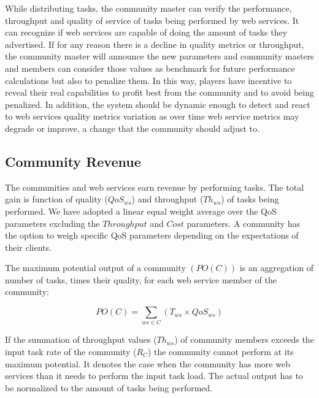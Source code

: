 While distributing tasks, the community master can verify the performance, throughput and quality of service of   tasks being performed by web services. It can recognize if web services are capable of doing the amount of tasks they advertised. If for any reason there is a decline in quality metrics or throughput, the  community master will announce the new parameters and community masters and members can consider those values as benchmark for future performance calculations but also to penalize them.
In this way, players have incentive to reveal their real capabilities to profit best from the community and to avoid being penalized. In addition, the system should be dynamic enough to detect and react to web services quality metrics variation as over time web service metrics may  degrade or improve, a change that the community should adjust to.

\subsection{Community Revenue}

The communities and web services earn revenue by performing tasks.
The total gain is function of quality ($QoS_{ws}$) and throughput
($Th_{ws}$) of tasks being performed. We have adopted a linear equal weight average over
the QoS parameters excluding the
$Throughput$ and $Cost$ parameters. A community has the option to
weigh specific QoS parameters depending on the expectations of
their clients.

The maximum potential output of a community $(PO(C))$  is an aggregation of number of tasks, times their quality, for each web service member of the community:

\begin{equation}
PO(C) = \sum_{ws \in C}{(T_{ws} \times QoS_{ws})}
\end{equation}

If the summation of throughput values ($Th_{ws}$) of community members exceeds the input task rate of the community ($R_C$) the community cannot perform at its maximum potential. It denotes the case when the community has more web services than it needs to perform the input task load. The actual output has to be normalized to the amount of tasks being performed.

